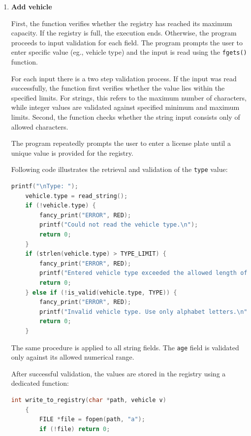 \documentclass[12pt, a4paper]{article}
\begin{document}
\begin{enumerate}
  \item \textbf{Add vehicle}

  First, the function verifies whether the registry has reached its maximum capacity. If the registry is full, the execution ends. 
  Otherwise, the program proceeds to input validation for each field.
  The program prompts the user to enter specific value (eg., vehicle type) and the input is read using the \texttt{fgets()} function.

  For each input there is a two step validation process. If the input was read successfully, the function first verifies whether the value lies within the specified limits.
  For strings, this refers to the maximum number of characters, while integer values are validated against specified minimum and maximum limits.
  Second, the function checks whether the string input consists only of allowed characters.

    The program repeatedly prompts the user to enter a license plate until a unique value is provided for the registry.

  Following code illustrates the retrieval and validation of the \texttt{type} value:

        \begin{lstlisting}[language=C, caption={Retrieving and validating vehicle data}]
    printf("\nType: ");
    vehicle.type = read_string();
    if (!vehicle.type) {
        fancy_print("ERROR", RED);
        printf("Could not read the vehicle type.\n");
        return 0;
    }
    if (strlen(vehicle.type) > TYPE_LIMIT) {
        fancy_print("ERROR", RED);
        printf("Entered vehicle type exceeded the allowed length of %d characters.\n", TYPE_LIMIT);
        return 0;
    } else if (!is_valid(vehicle.type, TYPE)) {
        fancy_print("ERROR", RED);
        printf("Invalid vehicle type. Use only alphabet letters.\n");
        return 0;
    }
    \end{lstlisting}
  
  The same procedure is applied to all string fields. The \texttt{age} field is validated only against its allowed numerical range.

  After successful validation, the values are stored in the registry using a dedicated function:

    \begin{lstlisting}[language=C, caption={Writing to the registry}]
    int write_to_registry(char *path, vehicle v)
    {
        FILE *file = fopen(path, "a");
        if (!file) return 0;
    

\end{lstlisting}
\end{enumerate}
\end{document}
